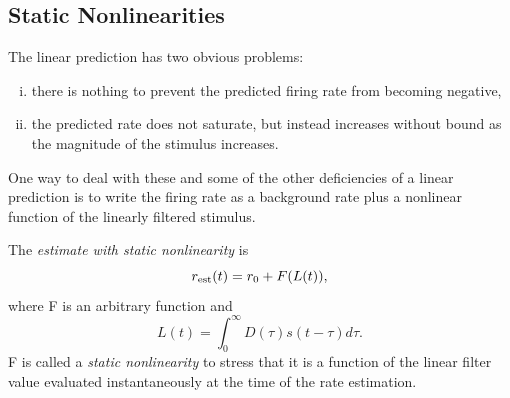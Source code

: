 \subsection{Static Nonlinearities}
\begin{rem}
  The linear prediction has two obvious problems:
  \begin{enumerate}[(i)]
  \item there is nothing to prevent the predicted firing rate from becoming negative,
  \item the predicted rate does not saturate, but instead increases without bound as the magnitude of the stimulus increases.
  \end{enumerate}
  One way to deal with these and some of the other deficiencies of a linear prediction is to write the firing rate as a background rate plus a nonlinear function of the linearly filtered stimulus.
\end{rem}

\begin{defn}
  \label{def:staticNonlinearity}
  The \emph{estimate with static nonlinearity} is
  \begin{equation}
    \label{equ:2.8}
    r_{\rm{est}}(t) = r_0 + F(L(t)),
  \end{equation}
  where F is an arbitrary function and
  \begin{equation}
    \label{equ:2.7}
    L(t) = \int_0^{\infty}D(\tau)s(t-\tau)d\tau.
  \end{equation}
  F is called a \emph{static nonlinearity} to stress that it is a function of the linear filter value evaluated instantaneously at the time of the rate estimation.
\end{defn}

